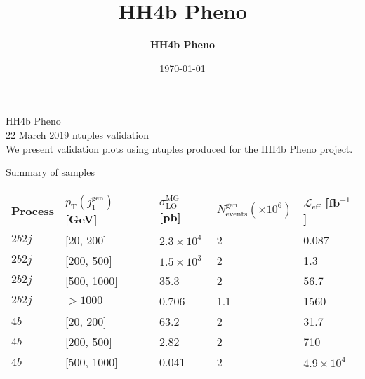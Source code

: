 \documentclass[10pt, aspectratio=169]{beamer}
\title{\vspace{2cm}\textbf{HH4b Pheno }}
\subtitle{}
\date{\today}
\author{\textbf{HH4b Pheno}}
\begin{document}

\begin{frame}

{\mdseries \Huge HH4b Pheno}\\[0.2cm]
{\mdseries \Large 22 March 2019 ntuples validation}\\[0.4cm]

We present validation plots using ntuples produced for the HH4b Pheno project.

\end{frame}


\begin{frame}{ Summary of samples }
\small
\centering
\begin{table}[]
\centering
\begin{tabular}{lllll}
\toprule
Process    & $p_\text{T}(j_1^\text{gen})$ [GeV] & $\sigma_\text{LO}^\text{MG}$ [pb] & $N_\text{events}^\text{gen} (\times 10^6)$ & $\mathcal{L}_\text{eff}$ [fb$^{-1}$] \\
\midrule
$2b2j$           & [20, 200]                & $2.3\times 10^4$                  & 2                                                & 0.087                                      \\
$2b2j$           & [200, 500]               & $1.5 \times 10^3$                 & 2                                                & 1.3                                        \\
$2b2j$           & [500, 1000]              & 35.3                              & 2                                                & 56.7                                       \\
$2b2j$           & $>1000$                  & 0.706                             & 1.1                                              & 1560                                       \\
\midrule
$4b$             & [20, 200]                & 63.2                              & 2                                                & 31.7                                       \\
$4b$             & [200, 500]               & 2.82                              & 2                                                & 710                                        \\
$4b$             & [500, 1000]              & 0.041                             & 2                                                & $4.9 \times 10^4$                          \\

\end{tabular}
\end{table}
\end{frame}
\end{document}
